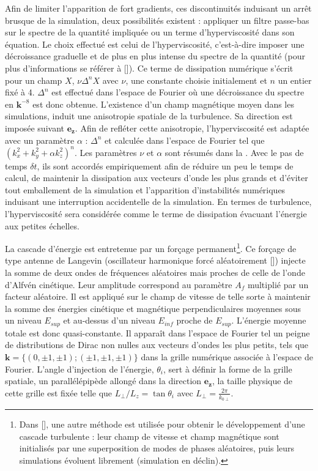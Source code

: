 Afin de limiter l'apparition de fort gradients, ces discontinuités induisant un arrêt brusque de la simulation, deux possibilités existent : appliquer un filtre passe-bas sur le spectre de la quantité impliquée ou un terme d'hyperviscosité dans son équation. Le choix effectué est celui de l'hyperviscosité, c'est-à-dire imposer une décroissance graduelle et de plus en plus intense du spectre de la quantité (pour plus d'informations se référer à [\cite{borue_forced_1995,frisch_hyperviscosity_2008}]). Ce terme de dissipation numérique s'écrit pour un champ $X$, $\nu \Delta^{n} X$ avec $\nu$, une constante choisie initialement et $n$ un entier fixé à 4. $\Delta^{n}$ est effectué dans l'espace de Fourier où une décroissance du spectre en $\boldsymbol{k}^{-8}$ est donc obtenue.   
L'existence d'un champ magnétique moyen dans les simulations, induit une anisotropie spatiale de la turbulence. Sa direction est imposée suivant $\boldsymbol{e_z}$. Afin de refléter cette anisotropie, l'hyperviscosité est adaptée avec un paramètre $\alpha$ : $\Delta^{n}$ et calculée dans l'espace de Fourier tel que $(k^2_x +  k^2_y + \alpha k^2_z)^n$. Les paramètres $\nu$ et $\alpha$ sont résumés dans la . Avec le pas de temps $\delta t$, ils sont accordés empiriquement afin de réduire un peu le temps de calcul, de maintenir la dissipation aux vecteurs d'onde les plus grands et d'éviter tout emballement de la simulation et l'apparition d'instabilités numériques induisant une interruption accidentelle de la simulation. En termes de turbulence, l'hyperviscosité sera considérée comme le terme de dissipation évacuant l'énergie aux petites échelles.

La cascade d'énergie est entretenue par un forçage permanent\footnote{Dans [\cite{hellinger_von_2018,gomez_parallel_2005,mininni_hybrid_2011}], une autre méthode est utilisée pour obtenir le développement d'une cascade turbulente : leur champ de vitesse et champ magnétique sont initialisés par une superposition de modes de phases aléatoires, puis leurs simulations évoluent librement (simulation en déclin).}. Ce forçage de type antenne de Langevin (oscillateur harmonique forcé aléatoirement [\cite{tenbarge_oscillating_2014}]) injecte la somme de deux ondes de fréquences aléatoires mais proches de celle de l'onde d'Alfvén cinétique. Leur amplitude correspond au paramètre $A_f$ multiplié par un facteur aléatoire. Il est  
appliqué sur le champ de vitesse de telle sorte à maintenir la somme des énergies cinétique et magnétique perpendiculaires moyennes sous un niveau $E_{sup}$ et au-dessus d'un niveau $E_{inf}$ proche de $E_{sup}$. L'énergie moyenne totale est donc quasi-constante. 
Il apparaît dans l'espace de Fourier tel un peigne de distributions de Dirac non nulles aux vecteurs d'ondes les plus petits, tels que $\boldsymbol{k} = \{(0,\pm 1, \pm 1);(\pm 1,\pm 1, \pm 1)\}$ dans la grille numérique associée à l'espace de Fourier. L'angle d'injection de l'énergie, $\theta_i$, sert à définir la forme de la grille spatiale, un parallélépipède allongé dans la direction $\boldsymbol{e_z}$, la taille physique de cette grille est fixée telle que $L_{\perp}/L_z = \tan \theta_i$ avec $L_{\perp} = \frac{2 \pi}{k_{0\perp}} $.

